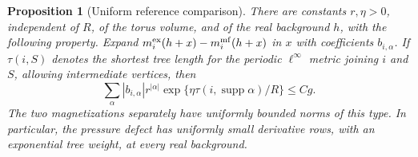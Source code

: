 \documentclass[11pt]{article}
\newtheorem{proposition}{Proposition}[section]
\begin{document}
\begin{proposition}[Uniform reference comparison]\label{prop:cavity}
There are constants \(r,\eta>0\), independent of \(R\), of the torus
volume, and of the real background \(h\), with the following property.
Expand \(m_i^{\rm ex}(h+x)-m_i^{\rm mf}(h+x)\) in \(x\) with coefficients
\(b_{i,\alpha}\). If \(\tau(i,S)\) denotes the shortest tree length for the periodic \(\ell^\infty\)
metric joining \(i\) and \(S\), allowing intermediate vertices,
then
\begin{equation}\label{eq:weighted}
 \sum_{\alpha}|b_{i,\alpha}|r^{|\alpha|}
       \exp\{\eta\tau(i,\operatorname{supp}\alpha)/R\}
 \le Cg.
\end{equation}
The two magnetizations separately have uniformly bounded norms of this
type. In particular, the pressure defect has uniformly small derivative
rows, with an exponential tree weight, at every real background.
\end{proposition}
\end{document}
